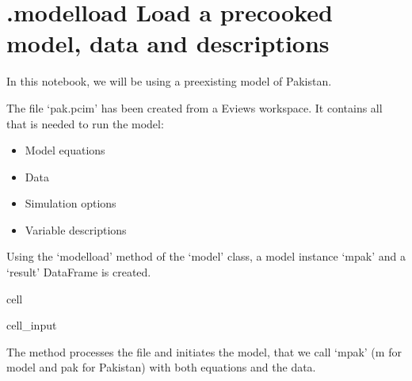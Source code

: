 \documentclass[letterpaper,10pt,english]{jupyterBook}
\begin{document}
\section{.modelload Load a pre\sphinxhyphen{}cooked model, data and descriptions}
\label{\detokenize{content/Python/modelflow_features:modelload-load-a-pre-cooked-model-data-and-descriptions}}
\sphinxAtStartPar
In this notebook, we will be using a pre\sphinxhyphen{}existing  model of Pakistan.

\sphinxAtStartPar
The file ‘pak.pcim’ has been created from a Eviews workspace. It contains all that is needed to run the model:
\begin{itemize}
\item {} 
\sphinxAtStartPar
Model equations

\item {} 
\sphinxAtStartPar
Data

\item {} 
\sphinxAtStartPar
Simulation options

\item {} 
\sphinxAtStartPar
Variable descriptions

\end{itemize}

\sphinxAtStartPar
Using the ‘modelload’ method of the  ‘model’ class, a model instance ‘mpak’ and a ‘result’ DataFrame is created.

\begin{sphinxuseclass}{cell}\begin{sphinxVerbatimInput}

\begin{sphinxuseclass}{cell_input}
\begin{sphinxVerbatim}[commandchars=\\\{\}]
  
\end{sphinxVerbatim}

\end{sphinxuseclass}\end{sphinxVerbatimInput}

\end{sphinxuseclass}
\sphinxAtStartPar
{} 
The  method processes the file and initiates the model, that we call ‘mpak’ (m for model and pak for Pakistan) with both equations and the data.
\end{document}
